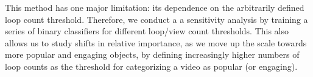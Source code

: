 This method has one major limitation: its dependence on the arbitrarily defined loop count threshold. Therefore, we conduct a a sensitivity analysis by training a series of binary classifiers for different loop/view count thresholds. This also allows us to study shifts in relative importance, as we move up the scale towards more popular and engaging objects, by defining increasingly higher numbers of loop counts as the threshold for categorizing a video as popular (or engaging). 
%
%
